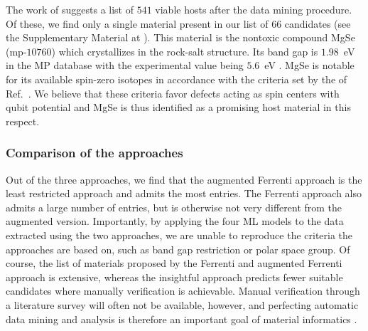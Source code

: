 \documentclass[superscriptaddress,unsortedaddress,
 amsmath,amssymb,
 aps,
]{revtex4-2}
\newcommand{\oliver}[1]{\textcolor{violet}{#1}}
\begin{document}
The work of \citeauthor{Ferrenti2020} \cite{Ferrenti2020} suggests a list of $541$ viable hosts after the data mining procedure.  
Of these, we find only a single material present in our list of $66$ candidates (see the Supplementary Material at \cite{supplementary}). This material is the nontoxic compound MgSe (mp-$10760$) which crystallizes in the rock-salt structure. Its band gap is $1.98$~eV in the MP database with the experimental value being $5.6$~eV  \cite{SaumGeorge1959}. MgSe is notable for its available spin-zero isotopes in accordance with the criteria set by the of Ref.~\cite{Ferrenti2020}. We believe that these criteria favor defects acting as spin centers with qubit potential and MgSe is thus identified as a promising host material in this respect.  


\subsubsection*{Comparison of the approaches}

Out of the three approaches, we find that the augmented Ferrenti approach is the least restricted approach and admits the most entries. The Ferrenti approach also admits a large number of entries, but is otherwise not very different from the augmented version. 
Importantly, by applying the four ML models to the data extracted using the two approaches, we are unable to reproduce the criteria the approaches are based on, such as band gap restriction or polar space group. Of course, the list of materials proposed by the Ferrenti and augmented Ferrenti approach is extensive, whereas the insightful approach predicts fewer suitable candidates where manually verification is achievable.  
Manual verification through a literature survey will often not be available, however, and perfecting automatic data mining and analysis is therefore an important goal of material informatics \cite{rickman2019}. 
\end{document}
